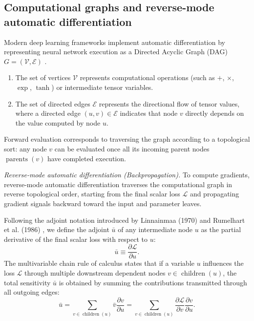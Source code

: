 \documentclass[../../main.tex]{subfiles}
\begin{document}
\subsection{Computational graphs and reverse-mode automatic differentiation}
\label{subsec:dag_reverse_autodiff}

Modern deep learning frameworks implement automatic differentiation by representing neural network execution as a Directed Acyclic Graph (DAG) $G = (\mathcal{V}, \mathcal{E})$ \citep{goodfellow2016,bishop2024deep}.
\begin{enumerate}[label=(\roman*)]
    \item The set of vertices $\mathcal{V}$ represents computational operations (such as $+$, $\times$, $\exp$, $\tanh$) or intermediate tensor variables.
    \item The set of directed edges $\mathcal{E}$ represents the directional flow of tensor values, where a directed edge $(u, v) \in \mathcal{E}$ indicates that node $v$ directly depends on the value computed by node $u$.
\end{enumerate}

Forward evaluation corresponds to traversing the graph according to a topological sort: any node $v$ can be evaluated once all its incoming parent nodes $\operatorname{parents}(v)$ have completed execution.

\textit{Reverse-mode automatic differentiation (Backpropagation).} To compute gradients, reverse-mode automatic differentiation traverses the computational graph in reverse topological order, starting from the final scalar loss $\mathcal{L}$ and propagating gradient signals backward toward the input and parameter leaves.

Following the adjoint notation introduced by Linnainmaa (1970) and Rumelhart et al. (1986) \citep{rumelhart1986}, we define the adjoint $\bar{u}$ of any intermediate node $u$ as the partial derivative of the final scalar loss with respect to $u$:
\begin{equation}
\bar{u} \equiv \frac{\partial \mathcal{L}}{\partial u}.
\end{equation}
The multivariable chain rule of calculus states that if a variable $u$ influences the loss $\mathcal{L}$ through multiple downstream dependent nodes $v \in \operatorname{children}(u)$, the total sensitivity $\bar{u}$ is obtained by summing the contributions transmitted through all outgoing edges:
\begin{equation}
\bar{u} = \sum_{v \in \operatorname{children}(u)} \bar{v} \frac{\partial v}{\partial u} = \sum_{v \in \operatorname{children}(u)} \frac{\partial \mathcal{L}}{\partial v} \frac{\partial v}{\partial u}.
\label{eq:adjoint_chain_rule}
\end{equation}
\end{document}
